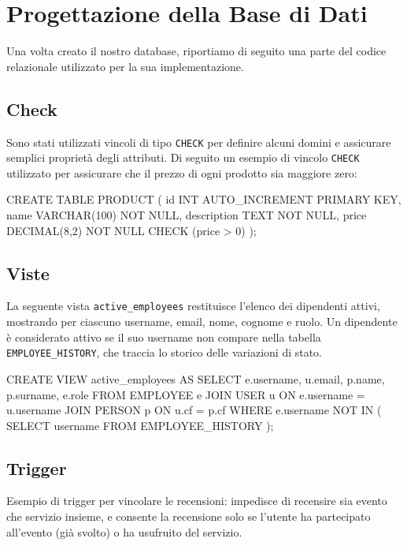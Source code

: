 \documentclass[a4paper,12pt]{report}
\begin{document}
\chapter{Progettazione della Base di Dati}
Una volta creato il nostro database, riportiamo di seguito una parte
del codice relazionale
utilizzato per la sua implementazione.

\section{Check}
Sono stati utilizzati vincoli di tipo \texttt{CHECK} per definire
alcuni domini e assicurare
semplici proprietà degli attributi. Di seguito un esempio di vincolo
\texttt{CHECK} utilizzato
per assicurare che il prezzo di ogni prodotto sia maggiore zero:

\begin{sqlcode}[caption={},label={lst:check}]
CREATE TABLE PRODUCT (
    id INT AUTO_INCREMENT PRIMARY KEY,
    name VARCHAR(100) NOT NULL,
    description TEXT NOT NULL,
    price DECIMAL(8,2) NOT NULL CHECK (price > 0)
);
\end{sqlcode}

\section{Viste}
La seguente vista \texttt{active\_employees} restituisce l'elenco dei
dipendenti attivi,
mostrando per ciascuno username, email, nome, cognome e ruolo. Un
dipendente è considerato
attivo se il suo username non compare nella tabella
\texttt{EMPLOYEE\_HISTORY}, che traccia
lo storico delle variazioni di stato.

\begin{sqlcode}[caption={},label={lst:view}]
CREATE VIEW active_employees AS
SELECT
    e.username,
    u.email,
    p.name,
    p.surname,
    e.role
FROM EMPLOYEE e
JOIN USER u ON e.username = u.username
JOIN PERSON p ON u.cf = p.cf
WHERE e.username NOT IN (
    SELECT username FROM EMPLOYEE_HISTORY
  );
\end{sqlcode}

\section{Trigger}
Esempio di trigger per vincolare le recensioni: impedisce di
recensire sia evento che servizio
insieme, e consente la recensione solo se l'utente ha partecipato
all'evento (già svolto) o ha
usufruito del servizio.
\end{document}
